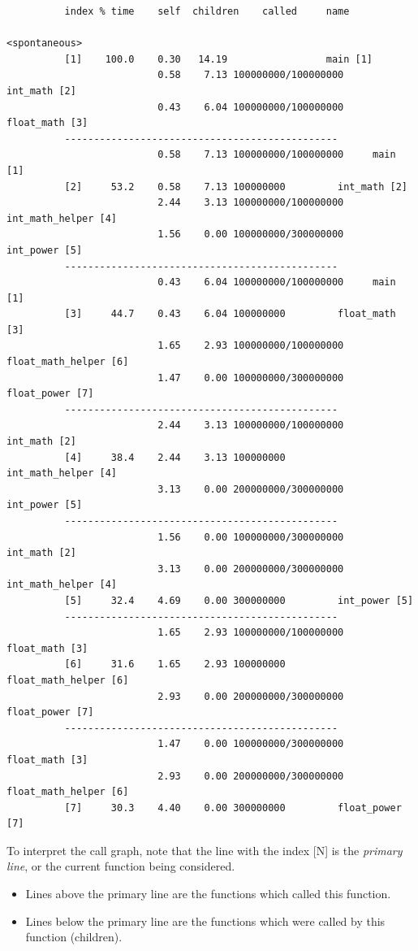   \begin{lstlisting}
          index % time    self  children    called     name
                                                           <spontaneous>
          [1]    100.0    0.30   14.19                 main [1]
                          0.58    7.13 100000000/100000000     int_math [2]
                          0.43    6.04 100000000/100000000     float_math [3]
          -----------------------------------------------
                          0.58    7.13 100000000/100000000     main [1]
          [2]     53.2    0.58    7.13 100000000         int_math [2]
                          2.44    3.13 100000000/100000000     int_math_helper [4]
                          1.56    0.00 100000000/300000000     int_power [5]
          -----------------------------------------------
                          0.43    6.04 100000000/100000000     main [1]
          [3]     44.7    0.43    6.04 100000000         float_math [3]
                          1.65    2.93 100000000/100000000     float_math_helper [6]
                          1.47    0.00 100000000/300000000     float_power [7]
          -----------------------------------------------
                          2.44    3.13 100000000/100000000     int_math [2]
          [4]     38.4    2.44    3.13 100000000         int_math_helper [4]
                          3.13    0.00 200000000/300000000     int_power [5]
          -----------------------------------------------
                          1.56    0.00 100000000/300000000     int_math [2]
                          3.13    0.00 200000000/300000000     int_math_helper [4]
          [5]     32.4    4.69    0.00 300000000         int_power [5]
          -----------------------------------------------
                          1.65    2.93 100000000/100000000     float_math [3]
          [6]     31.6    1.65    2.93 100000000         float_math_helper [6]
                          2.93    0.00 200000000/300000000     float_power [7]
          -----------------------------------------------
                          1.47    0.00 100000000/300000000     float_math [3]
                          2.93    0.00 200000000/300000000     float_math_helper [6]
          [7]     30.3    4.40    0.00 300000000         float_power [7]
  \end{lstlisting}

To interpret the call graph, note that the line with the index [N] is the \emph{primary line},
or the current function being considered.
\begin{itemize}
    \item Lines above the primary line are the functions which called this function.
    \item Lines below the primary line are the functions which were called by this function
      (children).
\end{itemize}

